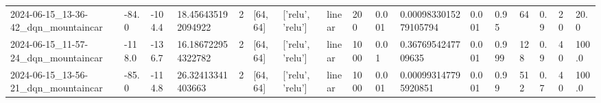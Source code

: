 \documentclass[a4paper,12pt]{article}
\begin{document}
\begin{table}[]
\begin{tabular}{lllllllllllllllll}
    2024-06-15\_13-36-42\_dqn\_mountaincar & -84.0                 & -104.4                  & 18.456435192094922     & 2              & {[}64, 64{]}      & {[}'relu', 'relu'{]}   & linear                    & 200           & 0.001          & 0.0009833015279105794 & 0.001        & 0.95           & 64          & 0.9      & 20                    & 20.0          \\
    2024-06-15\_11-57-24\_dqn\_mountaincar & -118.0                & -136.7                  & 16.186722954322782     & 2              & {[}64, 64{]}      & {[}'relu', 'relu'{]}   & linear                    & 1000          & 0.01           & 0.3676954247709635    & 0.001        & 0.999          & 128         & 0.9      & 40                    & 100.0         \\
    2024-06-15\_13-56-21\_dqn\_mountaincar & -85.0                 & -114.8                  & 26.32413341403663      & 2              & {[}64, 64{]}      & {[}'relu', 'relu'{]}   & linear                    & 1000          & 0.001          & 0.000993147795920851  & 0.001        & 0.99           & 512         & 0.7      & 40                    & 100.0
    \end{tabular}
    \end{table}
\end{document}
